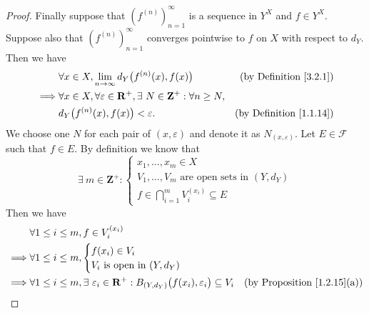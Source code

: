 \begin{proof}
    Finally suppose that \((f^{(n)})_{n = 1}^\infty\) is a sequence in \(Y^X\) and \(f \in Y^X\).
    Suppose also that \((f^{(n)})_{n = 1}^\infty\) converges pointwise to \(f\) on \(X\) with respect to \(d_Y\).
    Then we have
    \begin{align*}
                 & \forall x \in X, \lim_{n \to \infty} d_Y\big(f^{(n)}(x), f(x)\big)                                     & \text{(by Definition \ref{3.2.1})}  \\
        \implies & \forall x \in X, \forall \varepsilon \in \mathbf{R}^+, \exists\ N \in \mathbf{Z}^+ : \forall n \geq N,                                       \\
                 & d_Y\big(f^{(n)}(x), f(x)\big) < \varepsilon.                                                           & \text{(by Definition \ref{1.1.14})}
    \end{align*}
    We choose one \(N\) for each pair of \((x, \varepsilon)\) and denote it as \(N_{(x, \varepsilon)}\).
    Let \(E \in \mathcal{F}\) such that \(f \in E\).
    By definition we know that
    \[
        \exists\ m \in \mathbf{Z}^+ : \begin{cases}
            x_1, \dots, x_m \in X                              \\
            V_1, \dots, V_m \text{ are open sets in } (Y, d_Y) \\
            f \in \bigcap_{i = 1}^m V_i^{(x_i)} \subseteq E
        \end{cases}
    \]
    Then we have
    \begin{align*}
                 & \forall 1 \leq i \leq m, f \in V_i^{(x_i)}                                                                                                                                        \\
        \implies & \forall 1 \leq i \leq m, \begin{cases}
                                                f(x_i) \in V_i \\
                                                V_i \text{ is open in } (Y, d_Y)
                                            \end{cases}                                                                                                                          \\
        \implies & \forall 1 \leq i \leq m, \exists\ \varepsilon_i \in \mathbf{R}^+ : B_{(Y, d_Y)}\big(f(x_i), \varepsilon_i\big) \subseteq V_i            & \text{(by Proposition \ref{1.2.15}(a))} \\

\end{align*}
\end{proof}
